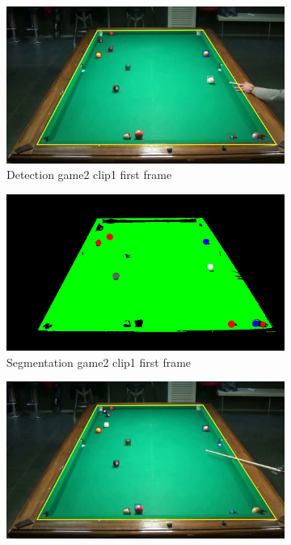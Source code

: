 \begin{figure}[H]
    \centering
    \begin{subfigure}[b]{0.48\textwidth}
        \centering
        \includegraphics[width=\textwidth]{images/Detection/game2_clip1_detected_balls_first_frame.jpg}
        \caption{Detection game2 clip1 first frame}
        \label{fig: game2_clip1_first_frame_detected}
    \end{subfigure}
    \begin{subfigure}[b]{0.48\textwidth}
        \centering
        \includegraphics[width=\textwidth]{images/Segmentation/game2_clip1_segmented_balls_first_frame.jpg}
        \caption{Segmentation game2 clip1 first frame}
		\label{fig: game2_clip1_first_frame_segmented}
    \end{subfigure}
    \centering
    \begin{subfigure}[b]{0.48\textwidth}
        \centering
        \includegraphics[width=\textwidth]{images/Detection/game2_clip1_detected_balls_last_frame.jpg}

\end{subfigure}
\end{figure}
